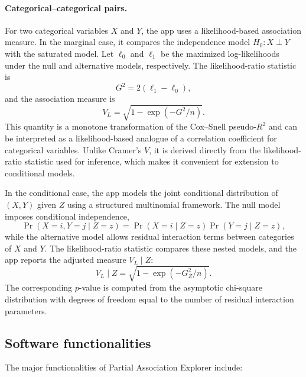 \documentclass[11pt,a4paper]{article}
\begin{document}
\paragraph{Categorical--categorical pairs.}
For two categorical variables $X$ and $Y$, the app uses a likelihood-based association measure. In the marginal case, it compares the independence model $H_0:X\perp Y$ with the saturated model. Let $\ell_0$ and $\ell_1$ be the maximized log-likelihoods under the null and alternative models, respectively. The likelihood-ratio statistic is
\[
G^2 = 2(\ell_1-\ell_0),
\]
and the association measure is
\[
V_L = \sqrt{1-\exp(-G^2/n)}.
\]
This quantity is a monotone transformation of the Cox--Snell pseudo-$R^2$ and can be interpreted as a likelihood-based analogue of a correlation coefficient for categorical variables. Unlike Cramer's $V$, it is derived directly from the likelihood-ratio statistic used for inference, which makes it convenient for extension to conditional models.

In the conditional case, the app models the joint conditional distribution of $(X,Y)$ given $Z$ using a structured multinomial framework. The null model imposes conditional independence,
\[
\Pr(X=i,Y=j\mid Z=z)=\Pr(X=i\mid Z=z)\Pr(Y=j\mid Z=z),
\]
while the alternative model allows residual interaction terms between categories of $X$ and $Y$. The likelihood-ratio statistic compares these nested models, and the app reports the adjusted measure $V_L\mid Z$:
\[
V_L\mid Z = \sqrt{1-\exp(-G^2_Z/n)}.
\]
The corresponding $p$-value is computed from the asymptotic chi-square distribution with degrees of freedom equal to the number of residual interaction parameters.

\subsection{Software functionalities}

The major functionalities of Partial Association Explorer include:
\end{document}
